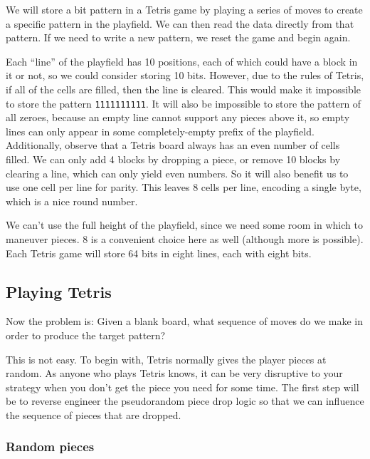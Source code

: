 \documentclass[twocolumn]{article}
\begin{document}
We will store a bit pattern in a Tetris game by playing a series of
moves to create a specific pattern in the playfield. We can then read
the data directly from that pattern. If we need to write a new
pattern, we reset the game and begin again.

Each ``line'' of the playfield has 10 positions, each of which could
have a block in it or not, so we could consider storing 10 bits.
However, due to the rules of Tetris, if all of the cells are filled,
then the line is cleared. This would make it impossible to store the
pattern {\tt 1111111111}. It will also be impossible to store the
pattern of all zeroes, because an empty line cannot support any pieces
above it, so empty lines can only appear in some completely-empty
prefix of the playfield. Additionally, observe that a Tetris board
always has an even number of cells filled. We can only add 4 blocks
by dropping a piece, or remove 10 blocks by clearing a line, which
can only yield even numbers. So it will also benefit us to use
one cell per line for parity. This leaves 8 cells per line, encoding
a single byte, which is a nice round number.

We can't use the full height of the playfield, since we need some
room in which to maneuver pieces. 8 is a convenient choice here as
well (although more is possible). Each Tetris game will store 64 bits
in eight lines, each with eight bits.

\subsection{Playing Tetris}

Now the problem is: Given a blank board, what sequence of moves do
we make in order to produce the target pattern?

This is not easy. To begin with, Tetris normally gives the player
pieces at random. As anyone who plays Tetris knows, it can be very
disruptive to your strategy when you don't get the piece you need for
some time. The first step will be to reverse engineer the pseudorandom
piece drop logic so that we can influence the sequence of pieces that
are dropped.

\subsubsection{Random pieces}
\end{document}
